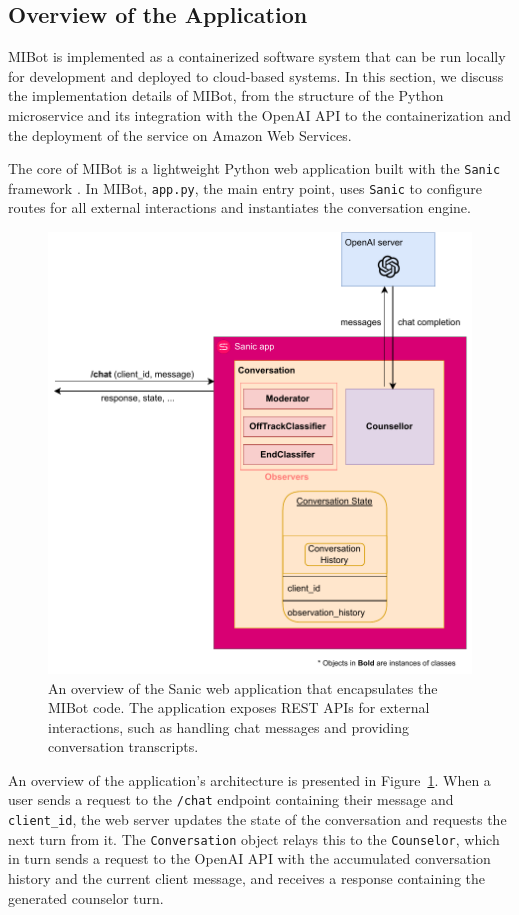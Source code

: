 \subsection{Overview of the Application}


MIBot is implemented as a containerized software system that can be run locally for development and deployed to cloud-based systems. In this section, we discuss the implementation details of MIBot, from the structure of the Python microservice and its integration with the OpenAI API to the containerization and the deployment of the service on Amazon Web Services.

The core of MIBot is a lightweight Python web application built with the \texttt{Sanic} framework \citep{pi_sanic}. In MIBot, \texttt{app.py}, the main entry point, uses \texttt{Sanic} to configure routes for all external interactions and instantiates the conversation engine.
\begin{figure}[ht]
  \centering
  \includegraphics[width=0.7\linewidth]{fig/microservice.drawio.pdf} 
  \caption[MIBot Sanic Application Overview]{An overview of the Sanic web application that encapsulates the MIBot code. The application exposes REST APIs for external interactions, such as handling chat messages and providing conversation transcripts.}
  \label{fig:microservice}
\end{figure}
An overview of the application's architecture is presented in Figure~\ref{fig:microservice}. When a user sends a request to the \texttt{/chat} endpoint containing their message and \texttt{client\_id}, the web server updates the state of the conversation and requests the next turn from it. The \texttt{Conversation} object relays this to the \texttt{Counselor}, which in turn sends a request to the OpenAI API with the accumulated conversation history and the current client message, and receives a response containing the generated counselor turn.

